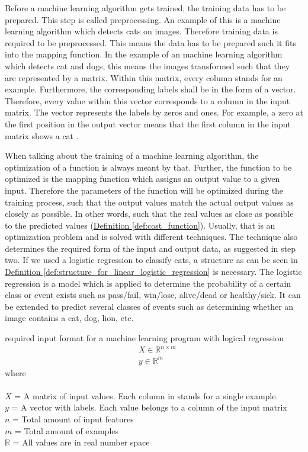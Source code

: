Before a machine learning algorithm gets trained, the training data has to be prepared. This step is called preprocessing. An example of this is a machine learning algorithm which detects cats on images. Therefore training data is required to be preprocessed. This means the data has to be prepared such it fits into the mapping function. In the example of an machine learning algorithm which detects cat and dogs, this means the images transformed such that they are represented by a matrix. Within this matrix, every column stands for an example. Furthermore, the corresponding labels shall be in the form of a vector. Therefore, every value within this vector corresponds to a column in the input matrix. The vector represents the labels by zeros and ones. For example, a zero at the first position in the output vector means that the first column in the input matrix shows a cat \cite{brownlee2019deep}.

When talking about the training of a machine learning algorithm, the optimization of a function is always meant by that. Further, the function to be optimized is the mapping function which assigns an output value to a given input. Therefore the parameters of the function will be optimized during the training process, such that the output values match the actual output values as closely as possible. In other words, such that the real values as close as possible to the predicted values  (\hyperref[def:cost_function]{Definition \ref{def:cost_function}}). Usually, that is an optimization problem and is solved with different techniques. The technique also determines the required form of the input and output data, as suggested in step two. If we used a logistic regression to classify cats, a structure as can be seen in \hyperref[def:structure_for_linear_logistic_regression]{Definition \ref{def:structure_for_linear_logistic_regression}} is necessary. The logistic regression is a model which is applied to determine the probability of a certain class or event exists such as pass/fail, win/lose, alive/dead or healthy/sick. It can be extended to predict several classes of events such as determining whether an image contains a cat, dog, lion, etc.

\begin{definition}[label=def:structure_for_linear_logistic_regression]{required input format for a machine learning program with logical regression}
	\begin{align*}
		& X \in \mathbb{R}^{n\times m}  \\
		& y \in \mathbb{R}^{m}
	\end{align*}
	where \\\\
	\( X \) = A matrix of input values. Each column in stands for a single example. \\
	\( y \) = A vector with labels. Each value belongs to a column of the input matrix\\
	\( n \) = Total amount of input features\\
	\( m \) = Total amount of examples\\
	\( \mathbb{R} \) = All values are in real number space \\
\end{definition}

